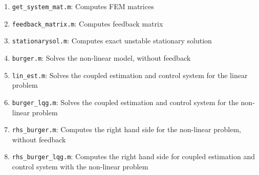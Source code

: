 \documentclass[12pt]{article}
\begin{document}
\begin{enumerate}

\item {\tt get\_system\_mat.m}: Computes FEM matrices

\item {\tt feedback\_matrix.m}: Computes feedback matrix

\item {\tt stationarysol.m}: Computes exact unstable stationary solution

\item {\tt burger.m}: Solves the non-linear model, without feedback

\item {\tt lin\_est.m}: Solves the coupled estimation and control system for the linear problem

\item {\tt burger\_lqg.m}: Solves the coupled estimation and control system for the non-linear problem

\item {\tt rhs\_burger.m}: Computes the right hand side for the non-linear problem, without feedback

\item {\tt rhs\_burger\_lqg.m}: Computes the right hand side for coupled estimation and control system with the non-linear problem

\end{enumerate}
\end{document}
